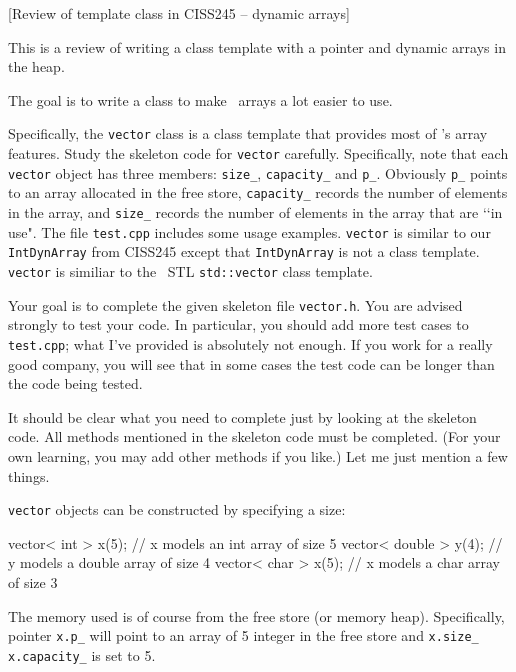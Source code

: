 [Review of template class in CISS245 -- dynamic arrays]

This is a review of writing a class template with a pointer
and dynamic arrays in the heap.

The goal is to write a class to make \cpp\ arrays a lot easier to use.

Specifically, the \verb!vector! class is a class template
that provides most of \cpp's array features.
Study the skeleton code for \verb!vector! carefully.
Specifically, note that each \verb!vector! object has three members:
\verb!size_!, \verb!capacity_! and \verb!p_!.
Obviously \verb!p_! points to an array allocated in the free store,
\verb!capacity_! records the number of elements in the array, and
\verb!size_! records the number of elements in the array that are \lq\lq in
use".
The file \verb!test.cpp! includes some usage examples.
\verb!vector! is similar to our \verb!IntDynArray! from CISS245 except that
\verb!IntDynArray! is not a class template.
\verb!vector! is similiar to the \cpp\ STL \verb!std::vector! class
template.

Your goal is to complete the given
skeleton file \verb!vector.h!.
You are advised strongly to test your code.
In particular, you should add more test cases to \verb!test.cpp!;
what I've provided is absolutely not enough.
If you work for a really good company, you will see
that in some cases the test code can be longer than the code
being tested.

It should be clear what you need to complete just by looking at the
skeleton code.
All methods mentioned in the skeleton code must be completed.
(For your own learning, you may add other methods if you like.)
Let me just mention a few things.

\verb!vector! objects can be constructed by specifying a size:
\begin{console}[fontsize=\footnotesize]
vector< int > x(5);    // x models an int array of size 5
vector< double > y(4); // y models a double array of size 4
vector< char > x(5);   // x models a char array of size 3
\end{console}
The memory used is of course from the free store (or memory heap).
Specifically, pointer \verb!x.p_! will point to an array
of 5 integer in the free store and 
\verb!x.size_!
\verb!x.capacity_!
is set to 5.


